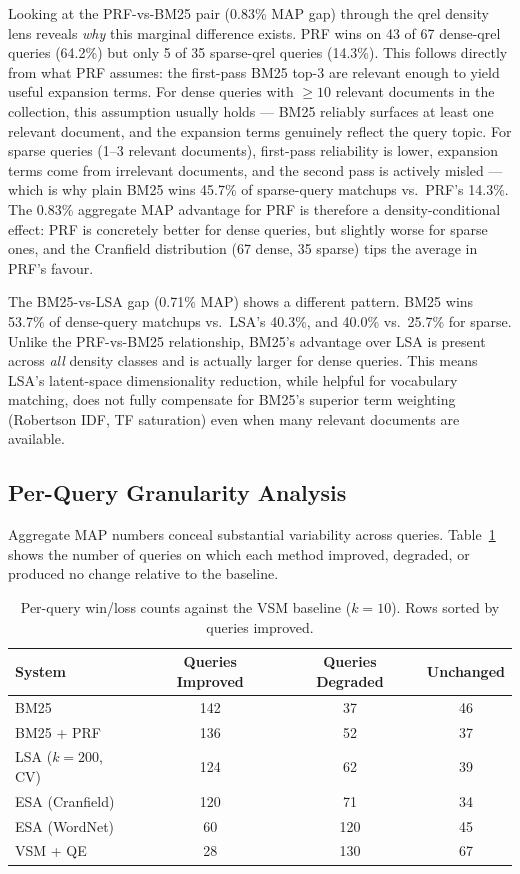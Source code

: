 \documentclass{article}
\begin{document}
Looking at the PRF-vs-BM25 pair (0.83\% MAP gap) through the qrel density lens reveals \emph{why} this marginal difference exists. PRF wins on 43 of 67 dense-qrel queries (64.2\%) but only 5 of 35 sparse-qrel queries (14.3\%). This follows directly from what PRF assumes: the first-pass BM25 top-3 are relevant enough to yield useful expansion terms. For dense queries with $\ge 10$ relevant documents in the collection, this assumption usually holds --- BM25 reliably surfaces at least one relevant document, and the expansion terms genuinely reflect the query topic. For sparse queries (1--3 relevant documents), first-pass reliability is lower, expansion terms come from irrelevant documents, and the second pass is actively misled --- which is why plain BM25 wins 45.7\% of sparse-query matchups vs.\ PRF's 14.3\%. The 0.83\% aggregate MAP advantage for PRF is therefore a density-conditional effect: PRF is concretely better for dense queries, but slightly worse for sparse ones, and the Cranfield distribution (67 dense, 35 sparse) tips the average in PRF's favour.

The BM25-vs-LSA gap (0.71\% MAP) shows a different pattern. BM25 wins 53.7\% of dense-query matchups vs.\ LSA's 40.3\%, and 40.0\% vs.\ 25.7\% for sparse. Unlike the PRF-vs-BM25 relationship, BM25's advantage over LSA is present across \emph{all} density classes and is actually larger for dense queries. This means LSA's latent-space dimensionality reduction, while helpful for vocabulary matching, does not fully compensate for BM25's superior term weighting (Robertson IDF, TF saturation) even when many relevant documents are available.

\subsection{Per-Query Granularity Analysis}

Aggregate MAP numbers conceal substantial variability across queries. Table~\ref{tab:pq} shows the number of queries on which each method improved, degraded, or produced no change relative to the baseline.

\begin{table}[H]
\centering
\renewcommand{\arraystretch}{1.2}
\begin{tabular}{lccc}
\toprule
\textbf{System} & \textbf{Queries Improved} & \textbf{Queries Degraded} & \textbf{Unchanged} \\
\midrule
BM25           & 142 & 37  & 46 \\
BM25 + PRF     & 136 & 52  & 37 \\
LSA ($k{=}200$, CV) & 124 & 62  & 39 \\
ESA (Cranfield)& 120 & 71  & 34 \\
ESA (WordNet)  & 60  & 120 & 45 \\
VSM + QE       & 28  & 130 & 67 \\
\bottomrule
\end{tabular}
\caption{Per-query win/loss counts against the VSM baseline ($k{=}10$). Rows sorted by queries improved.}
\label{tab:pq}
\end{table}
\end{document}
